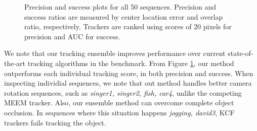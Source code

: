 \begin{figure}[h!]
\centering
{}
\caption[Precision and success plots for all 50 sequences]{\small  Precision and success plots for all 50 sequences. Precision and success
		ratios are measured by center location error and overlap ratio,
		respectively. Trackers are ranked using scores of 20 pixels for
		precision and AUC for success.}
\label{fig:results}
\end{figure}

We note that our tracking ensemble improves performance over current
state-of-the-art tracking algorithms in the benchmark.
From Figure \ref{fig:results}, our method outperforms each individual tracking
score, in both precision and success.
When inspecting individial sequences, we note that 
out method handles better camera
rotation sequences, such as \textit{singer1, singer2, fish, car4}, unlike
the competing
MEEM tracker. Also, our ensemble method can overcome complete object occlusion. In
sequences where this situation happens \textit{jogging, david3}, KCF trackers
fails tracking the object. 

